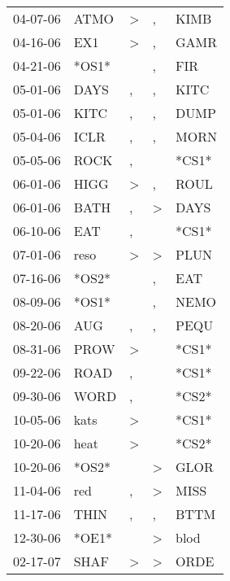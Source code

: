 \begin{supertabular}{lllll}
 04-07-06 &   ATMO &     \textgreater &                , &   KIMB \\
 04-16-06 &    EX1 &     \textgreater &                , &   GAMR \\
 04-21-06 &  *OS1* &                  &                , &    FIR \\
 05-01-06 &   DAYS &                , &                , &   KITC \\
 05-01-06 &   KITC &                , &                , &   DUMP \\
 05-04-06 &   ICLR &                , &                , &   MORN \\
 05-05-06 &   ROCK &                , &                  &  *CS1* \\
 06-01-06 &   HIGG &     \textgreater &                , &   ROUL \\
 06-01-06 &   BATH &                , &     \textgreater &   DAYS \\
 06-10-06 &    EAT &                , &                  &  *CS1* \\
 07-01-06 &   reso &     \textgreater &     \textgreater &   PLUN \\
 07-16-06 &  *OS2* &                  &                , &    EAT \\
 08-09-06 &  *OS1* &                  &                , &   NEMO \\
 08-20-06 &    AUG &                , &                , &   PEQU \\
 08-31-06 &   PROW &     \textgreater &                  &  *CS1* \\
 09-22-06 &   ROAD &                , &                  &  *CS1* \\
 09-30-06 &   WORD &                , &                  &  *CS2* \\
 10-05-06 &   kats &     \textgreater &                  &  *CS1* \\
 10-20-06 &   heat &     \textgreater &                  &  *CS2* \\
 10-20-06 &  *OS2* &                  &     \textgreater &   GLOR \\
 11-04-06 &    red &                , &     \textgreater &   MISS \\
 11-17-06 &   THIN &                , &                , &   BTTM \\
 12-30-06 &  *OE1* &                  &     \textgreater &   blod \\
 02-17-07 &   SHAF &     \textgreater &     \textgreater &   ORDE \\

\end{supertabular}
